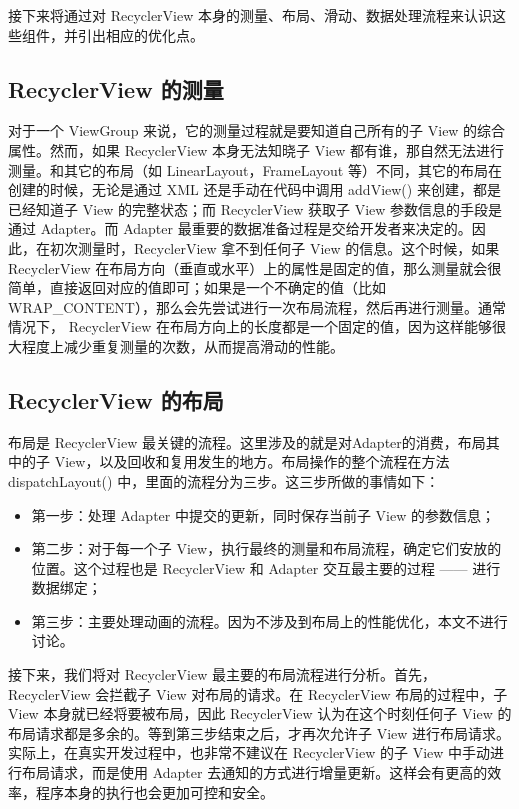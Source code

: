 接下来将通过对 RecyclerView 本身的测量、布局、滑动、数据处理流程来认识这些组件，并引出相应的优化点。

\subsection{RecyclerView 的测量}

对于一个 ViewGroup 来说，它的测量过程就是要知道自己所有的子 View 的综合属性。然而，如果 RecyclerView 本身无法知晓子 View 都有谁，那自然无法进行测量。和其它的布局（如 LinearLayout，FrameLayout 等）不同，其它的布局在创建的时候，无论是通过 XML 还是手动在代码中调用 addView() 来创建，都是已经知道子 View 的完整状态；而 RecyclerView 获取子 View 参数信息的手段是通过 Adapter。而 Adapter 最重要的数据准备过程是交给开发者来决定的。因此，在初次测量时，RecyclerView 拿不到任何子 View 的信息。这个时候，如果RecyclerView 在布局方向（垂直或水平）上的属性是固定的值，那么测量就会很简单，直接返回对应的值即可；如果是一个不确定的值（比如 WRAP\_CONTENT），那么会先尝试进行一次布局流程，然后再进行测量。通常情况下， RecyclerView 在布局方向上的长度都是一个固定的值，因为这样能够很大程度上减少重复测量的次数，从而提高滑动的性能。

\subsection{RecyclerView 的布局}

布局是 RecyclerView 最关键的流程。这里涉及的就是对Adapter的消费，布局其中的子 View，以及回收和复用发生的地方。布局操作的整个流程在方法 dispatchLayout() 中，里面的流程分为三步。这三步所做的事情如下：

\begin{itemize}
    \item 第一步：处理 Adapter 中提交的更新，同时保存当前子 View 的参数信息；
    \item 第二步：对于每一个子 View，执行最终的测量和布局流程，确定它们安放的位置。这个过程也是 RecyclerView 和 Adapter 交互最主要的过程 —— 进行数据绑定；
    \item 第三步：主要处理动画的流程。因为不涉及到布局上的性能优化，本文不进行讨论。
\end{itemize}

接下来，我们将对 RecyclerView 最主要的布局流程进行分析。首先，RecyclerView 会拦截子 View 对布局的请求。在 RecyclerView 布局的过程中，子 View 本身就已经将要被布局，因此 RecyclerView 认为在这个时刻任何子 View 的布局请求都是多余的。等到第三步结束之后，才再次允许子 View 进行布局请求。实际上，在真实开发过程中，也非常不建议在 RecyclerView 的子 View 中手动进行布局请求，而是使用 Adapter 去通知的方式进行增量更新。这样会有更高的效率，程序本身的执行也会更加可控和安全。

